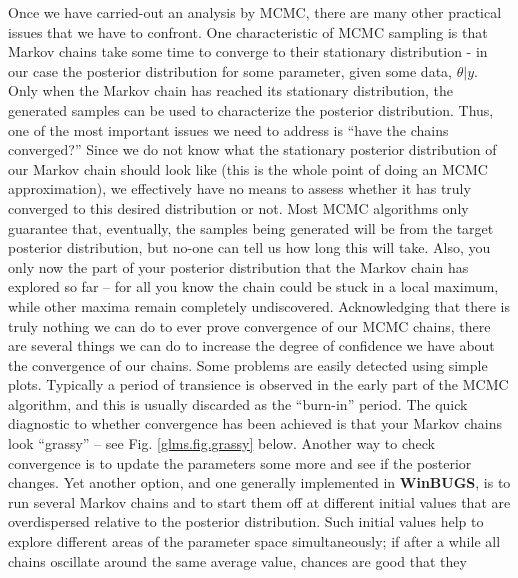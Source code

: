 Once we have carried-out an analysis by MCMC, there are many other
practical issues that we have to confront. One characteristic of MCMC sampling is that Markov chains take some time to converge to their stationary distribution - in our case the posterior distribution for some parameter, given some data, $\theta|y$. Only when the Markov chain has reached
its stationary distribution, the generated samples can be used to
characterize the posterior distribution. Thus, one of the most important issues we need to address 
is ``have the chains converged?'' Since we do not know what the
stationary posterior distribution of our Markov chain should look like
(this is the whole point of doing an MCMC approximation), we
effectively have no means to assess whether it has truly converged to
this desired distribution or not. Most MCMC algorithms only guarantee
that, eventually, the samples being generated will be from the target
posterior distribution, but no-one can tell us how long this will
take. Also, you only now the part of your posterior distribution that
the Markov chain has explored so far -- for all you know the chain
could be stuck in a local maximum, while other maxima remain
completely undiscovered.  Acknowledging that there is truly nothing we
can do to ever prove convergence of our MCMC chains, there are several
things we can do to increase the degree of confidence we have about
the convergence of our chains. Some problems are easily detected using
simple plots.  Typically a period of transience is observed in the
early part of the MCMC algorithm, and this is usually discarded as the
``burn-in'' period. The quick diagnostic to whether convergence has
been achieved is that your Markov chains look ``grassy'' -- see Fig.
\ref{glms.fig.grassy} below.  Another way to check convergence is to
update the parameters some more and see if the posterior changes. Yet
another option, and one generally implemented in {\bf WinBUGS}, is to
run several Markov chains and to start them off at different initial
values that are overdispersed relative to the posterior
distribution. Such initial values help to explore different areas of
the parameter space simultaneously; if after a while all chains
oscillate around the same average value, chances are good that they
